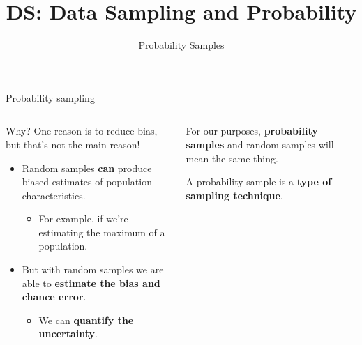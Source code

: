 \documentclass[aspectratio=169]{../latex_main/tntbeamer}  %
\title[Probability Samples]{DS: Data Sampling and Probability}
\subtitle{Probability Samples}
\begin{document}
	
	\maketitle
		\begin{frame}{Probability sampling}
	    \begin{columns}
	        \begin{column}{.4\textwidth}
	            Why? One reason is to reduce bias, but that’s not the main reason!
	            \begin{itemize}
	                \item Random samples \textbf{can} produce biased estimates of population characteristics.
	                \begin{itemize}
	                    \item For example, if we’re estimating the maximum of a population.
	                \end{itemize}
	                \item But with random samples we are able to \textbf{estimate the bias and chance error}.
	                \begin{itemize}
	                    \item We can \textbf{quantify the uncertainty}.
	                \end{itemize}
	            \end{itemize}
	        \end{column}
	        
	        \begin{column}{.5\textwidth}
	            For our purposes, \textbf{probability samples} and random samples will mean the same thing.
             
	            \bigskip
	            A probability sample is a \textbf{type of sampling technique}.
	        \end{column}
	        
	    \end{columns}
	    
	\end{frame}
	
\end{document}

